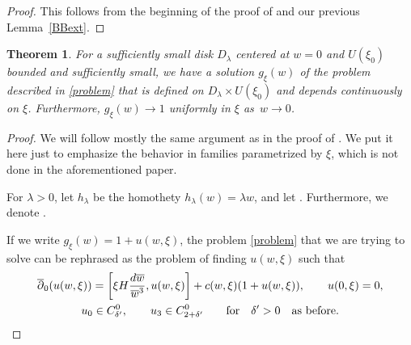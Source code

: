 \documentclass[11pt]{article}
\numberwithin{equation}{section}
\newtheorem{Theorem}{Theorem}[section]
\numberwithin{equation}{section}
\begin{document}
\begin{proof}
This follows from the beginning of the proof of \cite[Lemma 7.1]{BB04} and our previous Lem\-ma~\ref{BBext}.
\end{proof}

\begin{Theorem} For a sufficiently small disk $D_{\lambda}$ centered at $w=0$ and $U(\xi_0)$ bounded and sufficiently small, we have a solution $g_{\xi}(w)$ of the problem described in \eqref{problem} that is defined on ${D_{\lambda}\times U(\xi_0)}$ and depends continuously on $\xi$. Furthermore, $g_{\xi}(w) \to 1$ uniformly in $\xi$ as~${w\to 0}$.
\end{Theorem}

\begin{proof} We will follow mostly the same argument as in the proof of \cite[Lemma 7.1]{BB04}. We put it here just to emphasize the behavior in families parametrized by $\xi$, which is not done in the aforementioned paper.

For $\lambda >0$, let $h_{\lambda}$ be the homothety $h_{\lambda}(w)=\lambda w$, and let . Furthermore, we denote .

If we write $g_{\xi}(w)=1+u(w,\xi)$, the problem \eqref{problem} that we are trying to solve can be rephrased as the problem of finding $u(w,\xi)$ such that
\begin{gather*}
 \overline{\partial}_0(u(w,\xi))=\left[\xi H \frac{{\rm d}\overline{w}}{\overline{w}^3},u(w,\xi)\right] +c(w,\xi)(1+u(w,\xi)),\qquad
 u(0,\xi)=0,\\
 u_0 \in C^0_{\delta'},\qquad u_3 \in C^0_{2+\delta'} \qquad \text{for} \quad \delta'>0 \quad \text{as before}.
\end{gather*}


\end{proof}
\end{document}
